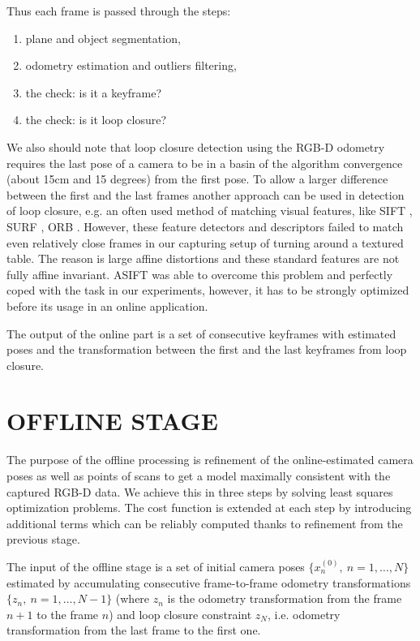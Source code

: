 \documentclass[letterpaper, 10 pt, conference]{ieeeconf}  %
\begin{document}
Thus each frame is passed through the steps:

\begin{enumerate}
 \item plane and object segmentation,
 \item odometry estimation and outliers filtering,
 \item the check: is it a keyframe?
 \item the check: is it loop closure?
\end{enumerate}

We also should note that loop closure detection using the RGB-D odometry requires
the last pose of a camera to be in a basin of
the algorithm convergence (about 15cm and 15 degrees) from the first pose. 
To allow a larger difference between the first and the last frames
another approach can be used in detection of loop closure, e.g.
an often used method of matching visual features, like
SIFT \cite{lowe2004distinctive}, SURF \cite{bay2006surf}, ORB \cite{rublee2011orb}.
However, these feature detectors and descriptors failed to match even
relatively close frames in our capturing setup of turning around a textured table.
The reason is large affine distortions
and these standard features are not fully affine invariant.
ASIFT \cite{morel2009asift} was able to overcome this problem
and perfectly coped with the task in our experiments,
however, it has to be strongly optimized before its usage in an online application.

The output of the online part is a set of consecutive keyframes with 
estimated poses and the transformation between the first and the last 
keyframes from loop closure.


\section{OFFLINE STAGE}

The purpose of the offline processing is refinement of the online-estimated 
camera poses as well as points of scans to get a model maximally 
consistent with the captured RGB-D data. We achieve this in three steps by 
solving least squares optimization problems. The cost function is extended at each step 
by introducing additional terms which can be reliably computed
thanks to refinement from the previous stage.


The input of the offline stage is a set of initial camera poses $\{x_n^{(0)},~n=1,\dots, N\}$ 
estimated by accumulating consecutive frame-to-frame odometry transformations 
$\{z_n,~n=1,\dots, N-1\}$  
(where $z_n$ is the odometry transformation from the frame $n+1$ to the frame $n$)
and loop closure constraint $z_{N}$, 
i.e. odometry transformation from the last frame to the first one.
\end{document}
